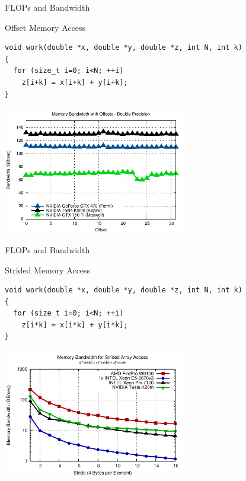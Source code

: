 \begin{frame}[fragile]{FLOPs and Bandwidth}

\begin{block}{Offset Memory Access}
  \begin{lstlisting}
void work(double *x, double *y, double *z, int N, int k)
{
  for (size_t i=0; i<N; ++i)
    z[i+k] = x[i+k] + y[i+k];
}  
  \end{lstlisting}
\end{block}

\vspace*{-0.5cm}
\begin{center}
 \includegraphics[width=0.6\textwidth]{figures/offset}
\end{center}

\end{frame}




\begin{frame}[fragile]{FLOPs and Bandwidth}

\begin{block}{Strided Memory Access}
  \begin{lstlisting}
void work(double *x, double *y, double *z, int N, int k)
{
  for (size_t i=0; i<N; ++i)
    z[i*k] = x[i*k] + y[i*k];
}  
  \end{lstlisting}
\end{block}

\vspace*{-0.5cm}
\begin{center}
 \includegraphics[width=0.6\textwidth]{figures/strided-access}
\end{center}

\end{frame}


